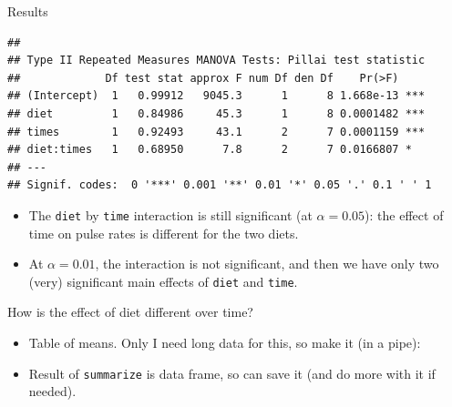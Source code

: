 \begin{frame}[fragile]{Results}
  
  {\footnotesize
\begin{knitrout}
\color{fgcolor}\begin{kframe}
\begin{alltt}
\end{alltt}
\begin{verbatim}
## 
## Type II Repeated Measures MANOVA Tests: Pillai test statistic
##             Df test stat approx F num Df den Df    Pr(>F)    
## (Intercept)  1   0.99912   9045.3      1      8 1.668e-13 ***
## diet         1   0.84986     45.3      1      8 0.0001482 ***
## times        1   0.92493     43.1      2      7 0.0001159 ***
## diet:times   1   0.68950      7.8      2      7 0.0166807 *  
## ---
## Signif. codes:  0 '***' 0.001 '**' 0.01 '*' 0.05 '.' 0.1 ' ' 1
\end{verbatim}
\end{kframe}
\end{knitrout}
  }
  
  \begin{itemize}
  \item The \texttt{diet} by \texttt{time} interaction is still
    significant (at $\alpha=0.05$): the effect of time on pulse rates is different for
    the two diets.
  \item At $\alpha=0.01$, the interaction is not significant, and then
    we have only two (very) significant main effects of \texttt{diet}
    and \texttt{time}. 
  \end{itemize}
  
\end{frame}

\begin{frame}[fragile]{How is the effect of diet different over time?}
  
  \begin{itemize}
  \item Table of means. Only I need long data for this, so make it (in
    a pipe):
    
\begin{knitrout}
\color{fgcolor}
\end{knitrout}

\item Result of \texttt{summarize} is data frame, so can save it (and
  do more with it if needed).

  \end{itemize}
  
\end{frame}

